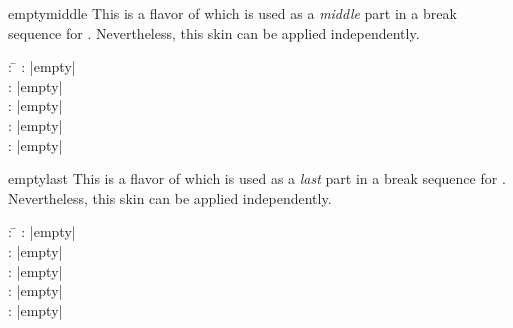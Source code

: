 \begin{dispExample}
\end{dispExample}


\clearpage

\begin{docSkin}{emptymiddle}
This is a flavor of  which is used as a \emph{middle} part
in a break sequence for .
Nevertheless, this skin can be applied independently.
\begin{tcolorbox}[skintable=emptymiddle]
  \begin{tabbing}
    : \=\kill
    :           \> |empty|\\
    : \> |empty|\\ 
    :        \> |empty|\\
    :    \> |empty|\\
    :           \> |empty|
  \end{tabbing}
\end{tcolorbox}
\end{docSkin}


\begin{dispExample}
\end{dispExample}


\clearpage
\begin{docSkin}{emptylast}
This is a flavor of  which is used as a \emph{last} part
in a break sequence for .
Nevertheless, this skin can be applied independently.
\begin{tcolorbox}[skintable=emptylast]
  \begin{tabbing}
    : \=\kill
    :           \> |empty|\\
    : \> |empty|\\ 
    :        \> |empty|\\
    :    \> |empty|\\
    :           \> |empty|
  \end{tabbing}
\end{tcolorbox}
\end{docSkin}

